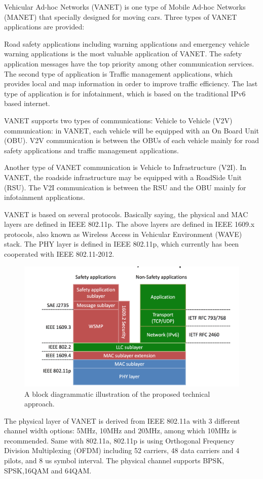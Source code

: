 Vehicular Ad-hoc Networks (VANET) is one type of Mobile Ad-hoc Networks (MANET) that specially designed for moving cars. Three types of VANET applications are provided: 

Road safety applications including warning applications and emergency vehicle warning applications is the most valuable application of VANET. The safety application messages have the top priority among other communication services. The second type of application is Traffic management applications, which provides local and map information in order to improve traffic efficiency. The last type of application is for infotainment, which is based on the traditional IPv6 based internet. 

VANET supports two types of communications: Vehicle to Vehicle (V2V) communication: in VANET, each vehicle will be equipped with an On Board Unit (OBU). V2V communication is between the OBUs of each vehicle mainly for road safety applications and traffic management applications. 

Another type of VANET communication is Vehicle to Infrastructure (V2I). In VANET, the roadside infrastructure may be equipped with a RoadSide Unit (RSU). The V2I communication is between the RSU and the OBU mainly for infotainment applications. 

VANET is based on several protocols. Basically saying, the physical and MAC layers are defined in IEEE 802.11p. The above layers are defined in IEEE 1609.x protocols, also known as Wireless Access in Vehicular Environment (WAVE) stack. The PHY layer is defined in IEEE 802.11p, which currently has been cooperated with IEEE 802.11-2012. 

\begin{figure}[h!]
	\centering
	\includegraphics[width=0.7\columnwidth]{figures/WAVE_stack.png}
	\caption{A block diagrammatic illustration of the proposed technical approach.}
	\label{fig-project-block}
\end{figure}

The physical layer of VANET is derived from IEEE 802.11a with 3 different channel width options: 5MHz, 10MHz and 20MHz, among which 10MHz is recommended. Same with 802.11a, 802.11p is using Orthogonal Frequency Division Multiplexing (OFDM) including 52 carriers, 48 data carriers and 4 pilots, and 8 us symbol interval. The physical channel supports BPSK, SPSK,16QAM and 64QAM. 

